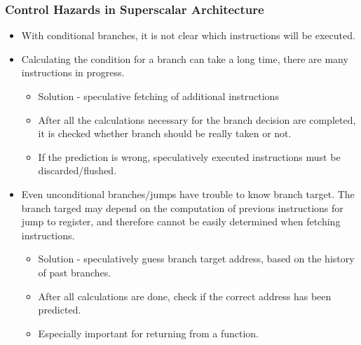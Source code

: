 \documentclass{beamer}
\begin{document}
\begin{frame}
\frametitle{Control Hazards in Superscalar Architecture}

\begin{itemize}
\item With conditional branches, it is not clear which instructions will be executed.
\item Calculating the condition for a branch can take a long time, there are many instructions in progress.
\begin{itemize}
\item Solution - speculative fetching of additional instructions
\item After all the calculations necessary for the branch decision are completed, it is checked whether branch should be really taken or not.
\item If the prediction is wrong, speculatively executed instructions must be discarded/flushed.
\end{itemize}
\item Even unconditional branches/jumps have trouble to know branch target. The branch targed may depend on the computation of previous instructions for jump to register, and therefore cannot be easily determined when fetching instructions.
\begin{itemize}
\item Solution - speculatively guess branch target address, based on the history of past branches.
\item After all calculations are done, check if the correct address has been predicted.
\item Especially important for returning from a function.
\end{itemize}
\end{itemize}

\end{frame}
\end{document}
